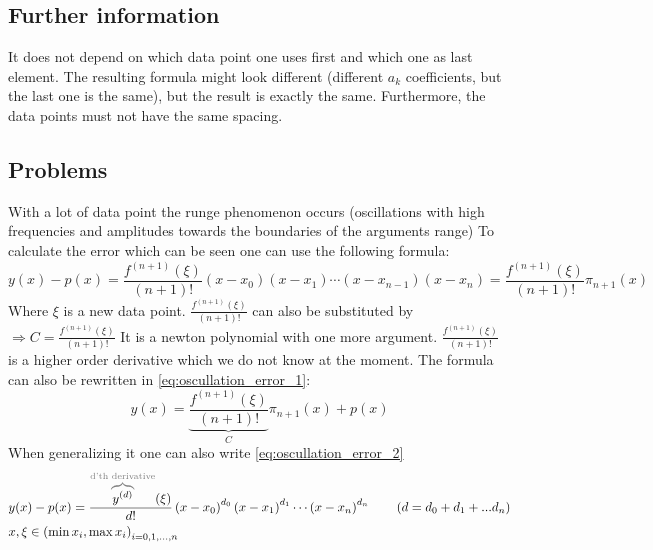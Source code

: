 \subsection{Further information}
It does not depend on which data point one uses first and which one as last element. The resulting formula might look different (different $a_k$ coefficients, but the last one is the same), but the result is exactly the same. Furthermore, the data points must not have the same spacing.
\subsection{Problems}
With a lot of data point the runge phenomenon occurs (oscillations with high frequencies and amplitudes towards the boundaries of the arguments range)
To calculate the error which can be seen one can use the following formula:
$$
y(x)-p(x)=\frac{f^{(n+1)}(\xi)}{(n+1) !}\left(x-x_0\right)\left(x-x_1\right) \cdots\left(x-x_{n-1}\right)\left(x-x_n\right)=\frac{f^{(n+1)}(\xi)}{(n+1) !} \pi_{n+1}(x)
$$
Where $\xi$ is a new data point. \newline
$\frac{f^{(n+1)}(\xi)}{(n+1) !}$ can also be substituted by $\Rightarrow C=\frac{f^{(n+1)}(\xi)}{(n+1) !}$ \newline
It is a newton polynomial with one more argument. $\frac{f^{(n+1)}(\xi)}{(n+1) !}$ is a higher order derivative which we do not know at the moment. The formula can also be rewritten in \autoref{eq:oscullation_error_1}:
\begin{equation}\label{eq:oscullation_error_1}
y(x)=\underbrace{\frac{f^{(n+1)}(\xi)}{(n+1) !}}_{C} \pi_{n+1}(x)+p(x) 
\end{equation}
When generalizing it one can also write \autoref{eq:oscullation_error_2}
\begin{equation}\label{eq:oscullation_error_2}
\begin{aligned}
& y(x)-p(x)=\frac{\textcolor{gray}{\overbrace{\textcolor{black}{y^{(d)}}}^{\text{d'th derivative}}}(\xi)}{d !}\left(x-x_0\right)^{d_0}\left(x-x_1\right)^{d_1} \cdots\left(x-x_n\right)^{d_n} \quad\quad  (d=d_0+d_1+...d_n) \\
& x, \xi \in\left(\min x_i, \max x_i\right)_{i=0,1, \ldots, n}
\end{aligned}
\end{equation}
